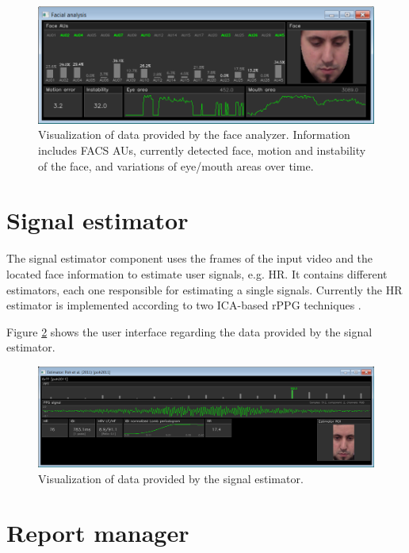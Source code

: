 \begin{figure}[h]
    \centering
    \includegraphics[width=\textwidth]{figures/tool-ui-face-analyzer.png}
    \caption{Visualization of data provided by the face analyzer. Information includes FACS AUs, currently detected face, motion and instability of the face, and variations of eye/mouth areas over time.}
    \label{fig:tool-ui-face-analyzer}
\end{figure}

\section{Signal estimator}

The signal estimator component uses the frames of the input video and the located face information to estimate user signals, e.g. HR. It contains different estimators, each one responsible for estimating a single signals. Currently the HR estimator is implemented according to two ICA-based rPPG techniques \parencite{poh2010non,poh2011advancements}.

Figure \ref{fig:tool-ui-signal-estimator} shows the user interface regarding the data provided by the signal estimator.

\begin{figure}[h]
    \centering
    \includegraphics[width=\textwidth]{figures/tool-ui-signal-estimator.png}
    \caption{Visualization of data provided by the signal estimator.}
    \label{fig:tool-ui-signal-estimator}
\end{figure}

\section{Report manager}

